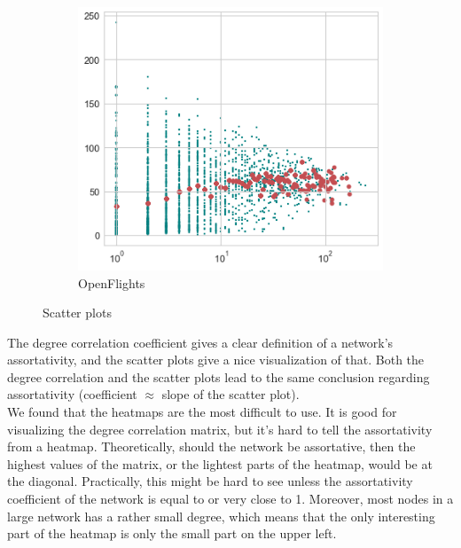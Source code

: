 \documentclass[../document.tex]{subfiles}
\begin{document}
\begin{figure}[h]
    ~
    \begin{subfigure}[b]{0.3\textwidth}
        \includegraphics[width=\textwidth]{img/scatter_2}
        \caption*{OpenFlights}
    \end{subfigure}
    \caption{Scatter plots}
\end{figure}



The degree correlation coefficient gives a clear definition of a network's assortativity, and the scatter plots give a nice visualization of that. 
Both the degree correlation and the scatter plots lead to the same conclusion regarding assortativity (coefficient $\approx$ slope of the scatter plot).\\

We found that the heatmaps are the most difficult to use. It is good for visualizing the degree correlation matrix, but it's hard to tell the assortativity from a heatmap.
Theoretically, should the network be assortative, then the highest values of the matrix, or the lightest parts of the heatmap, would be at the diagonal. Practically, this might be hard to see unless the assortativity coefficient of the network is equal to or very close to 1. 
Moreover, most nodes in a large network has a rather small degree, which means that the only interesting part of the heatmap is only the small part on the upper left. 
\end{document}
